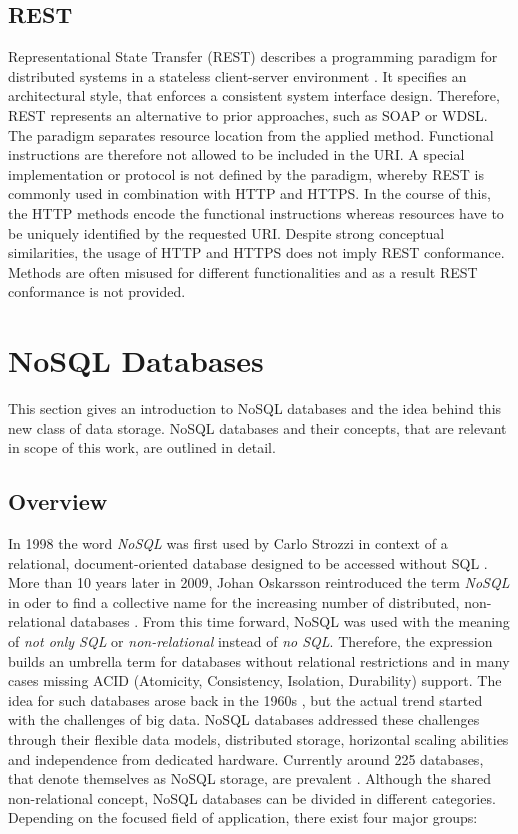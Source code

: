 \subsection{REST}
Representational State Transfer (REST) describes a programming paradigm for distributed systems in a stateless client-server environment \cite{Fielding:2000}. It specifies an architectural style, that enforces a consistent system interface design. Therefore, REST represents an alternative to prior approaches, such as SOAP or WDSL. The paradigm separates resource location from the applied method. Functional instructions are therefore not allowed to be included in the URI. A special implementation or protocol is not defined by the paradigm, whereby REST is commonly used in combination with HTTP and HTTPS. In the course of this, the HTTP methods encode the functional instructions whereas resources have to be uniquely identified by the requested URI. Despite strong conceptual similarities, the usage of HTTP and HTTPS does not imply REST conformance. Methods are often misused for different functionalities and as a result REST conformance is not provided.

\section{NoSQL Databases}
This section gives an introduction to NoSQL databases and the idea behind this new class of data storage. NoSQL databases and their concepts, that are relevant in scope of this work, are outlined in detail.

\subsection{Overview}
In 1998 the word \textit{NoSQL} was first used by Carlo Strozzi in context of a relational, document-oriented database designed to be accessed without SQL \cite{Strozzi:2007}. More than 10 years later in 2009, Johan Oskarsson reintroduced the term \textit{NoSQL} in oder to find a collective name for the increasing number of distributed, non-relational databases \cite{Oskarsson:2009}. From this time forward, NoSQL was used with the meaning of \textit{not only SQL} or \textit{non-relational} instead of \textit{no SQL}. Therefore, the expression builds an umbrella term for databases without relational restrictions and in many cases missing ACID (Atomicity, Consistency, Isolation, Durability) support. The idea for such databases arose back in the 1960s \cite{IBM:2016, Nelson:1965}, but the actual trend started with the challenges of big data. NoSQL databases addressed these challenges through their flexible data models, distributed storage, horizontal scaling abilities and independence from dedicated hardware. Currently around 225 databases, that denote themselves as NoSQL storage, are prevalent \cite{Edlich:2016}. Although the shared non-relational concept, NoSQL databases can be divided in different categories. Depending on the focused field of application, there exist four major groups:

